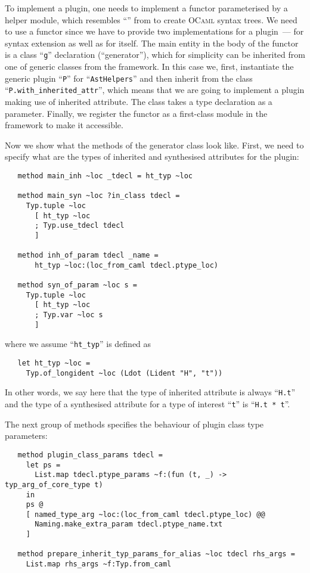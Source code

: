 To implement a plugin, one needs to implement a functor parameterised by a helper module, which resembles ``'' from
 to create \textsc{OCaml} syntax trees. We need to use a functor since we have to provide two implementations for
a plugin~--- for  syntax extension as well as for  itself. The main entity in the body of the functor is
a class ``\lstinline{g}'' declaration (``generator''), which for simplicity can be inherited from one of generic classes 
from the framework. In this case we, first, instantiate the generic plugin ``\lstinline{P}'' for ``\lstinline{AstHelpers}'' and
then inherit from the class ``\lstinline{P.with_inherited_attr}'', which means that we are going to implement a plugin
making use of inherited attribute. The class takes a type declaration as a parameter. Finally, we register the functor as a
first-class module in the framework to make it accessible.

Now we show what the methods of the generator class look like. First, we need to specify what are the types of inherited and
synthesised attributes for the plugin:

\begin{lstlisting}
   method main_inh ~loc _tdecl = ht_typ ~loc

   method main_syn ~loc ?in_class tdecl =
     Typ.tuple ~loc
       [ ht_typ ~loc
       ; Typ.use_tdecl tdecl
       ]

   method inh_of_param tdecl _name =
       ht_typ ~loc:(loc_from_caml tdecl.ptype_loc)

   method syn_of_param ~loc s =
     Typ.tuple ~loc
       [ ht_typ ~loc
       ; Typ.var ~loc s
       ]
\end{lstlisting}

where we assume ``\lstinline{ht_typ}'' is defined as

\begin{lstlisting}
   let ht_typ ~loc =
     Typ.of_longident ~loc (Ldot (Lident "H", "t"))
\end{lstlisting}

In other words, we say here that the type of inherited attribute is always ``\lstinline{H.t}'' and the type of a synthesised attribute for
a type of interest ``\lstinline{t}'' is ``\lstinline{H.t * t}''.

The next group of methods specifies the behaviour of plugin class type parameters:

\begin{lstlisting}
   method plugin_class_params tdecl =
     let ps =
       List.map tdecl.ptype_params ~f:(fun (t, _) -> typ_arg_of_core_type t)
     in
     ps @
     [ named_type_arg ~loc:(loc_from_caml tdecl.ptype_loc) @@
       Naming.make_extra_param tdecl.ptype_name.txt
     ]

   method prepare_inherit_typ_params_for_alias ~loc tdecl rhs_args =
     List.map rhs_args ~f:Typ.from_caml
\end{lstlisting}

